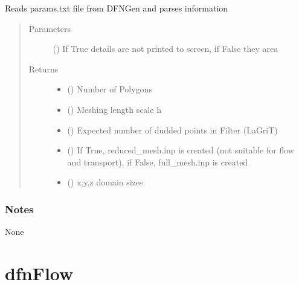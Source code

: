 \documentclass[letterpaper,10pt,english]{sphinxmanual}
\begin{document}
\begin{fulllineitems}
\label{\detokenize{pydfnworks:pydfnworks.dfnGen.mesh_dfn_helper.parse_params_file}}
Reads params.txt file from DFNGen and parses information
\begin{quote}\begin{description}
\item[{Parameters}] \leavevmode
{} () \textendash{} If True details are not printed to screen, if False they area

\item[{Returns}] \leavevmode
\begin{itemize}
\item {} 
 () \textendash{} Number of Polygons

\item {} 
 () \textendash{} Meshing length scale h

\item {} 
 () \textendash{} Expected number of dudded points in Filter (LaGriT)

\item {} 
 () \textendash{} If True, reduced\_mesh.inp is created (not suitable for flow and transport), if False, full\_mesh.inp is created

\item {} 
 () \textendash{} x,y,z domain sizes

\end{itemize}


\end{description}\end{quote}
\subsubsection*{Notes}

None

\end{fulllineitems}



\section{dfnFlow}
\label{\detokenize{pydfnworks:dfnflow}}
\end{document}
